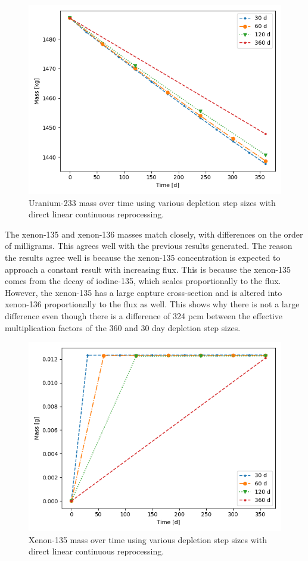 \begin{figure}[H]
  \centering
  \includegraphics[scale=0.7]{images/DL_NSTEP_U-233_mass-large.png}
  \caption{Uranium-233 mass over time using various depletion step sizes with direct linear continuous reprocessing.}
   \label{fig:DL-cont-u-2}
\end{figure}

The xenon-135 and xenon-136 masses match closely, with differences on the order of milligrams. This agrees well with the previous results generated. The reason the results agree well is because the xenon-135 concentration is expected to approach a constant result with increasing flux. This is because the xenon-135 comes from the decay of iodine-135, which scales proportionally to the flux. However, the xenon-135 has a large capture cross-section and is altered into xenon-136 proportionally to the flux as well. This shows why there is not a large difference even though there is a difference of 324 pcm between the effective multiplication factors of the 360 and 30 day depletion step sizes.

\begin{figure}[H]
  \centering
  \includegraphics[scale=0.7]{images/DL_NSTEP_Xe-135_mass-large.png}
  \caption{Xenon-135 mass over time using various depletion step sizes with direct linear continuous reprocessing.}
   \label{fig:DL-cont-xe135-2}
\end{figure}

